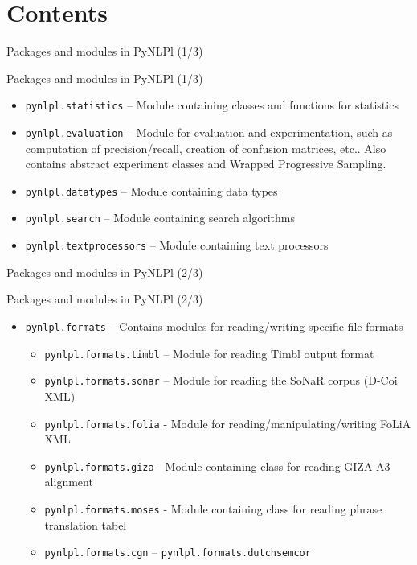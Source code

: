 \documentclass[compress]{beamer}
\begin{document}
\section{Contents}

\begin{frame}{Packages and modules in PyNLPl (1/3)}
    \begin{block}{Packages and modules in PyNLPl (1/3)}
        \begin{itemize}
            \item \texttt{pynlpl.statistics} -- Module containing classes and functions for statistics
            \item \texttt{pynlpl.evaluation} -- Module for evaluation and experimentation, such as computation of precision/recall, creation of confusion matrices, etc.. Also contains abstract experiment classes and Wrapped Progressive Sampling.
            \item \texttt{pynlpl.datatypes} -- Module containing data types
            \item \texttt{pynlpl.search} -- Module containing search algorithms
            \item \texttt{pynlpl.textprocessors} -- Module containing text processors
        \end{itemize}
    \end{block}

\end{frame}

\begin{frame}{Packages and modules in PyNLPl (2/3)}
    \begin{block}{Packages and modules in PyNLPl (2/3)}
        \begin{itemize}
            \item \texttt{pynlpl.formats} -- Contains modules for reading/writing specific file formats
            \begin{itemize}
                \item \texttt{pynlpl.formats.timbl} -- Module for reading Timbl output format
                \item \texttt{pynlpl.formats.sonar} -- Module for reading the SoNaR corpus (D-Coi XML)
                \item \texttt{pynlpl.formats.folia} - Module for reading/manipulating/writing FoLiA XML
                \item \texttt{pynlpl.formats.giza} - Module containing class for reading GIZA A3 alignment
                \item \texttt{pynlpl.formats.moses} - Module containing class for reading phrase translation tabel                
                \item \texttt{pynlpl.formats.cgn} -- \texttt{pynlpl.formats.dutchsemcor}
            \end{itemize}
        \end{itemize}
    \end{block}

\end{frame}
    
\end{document}
